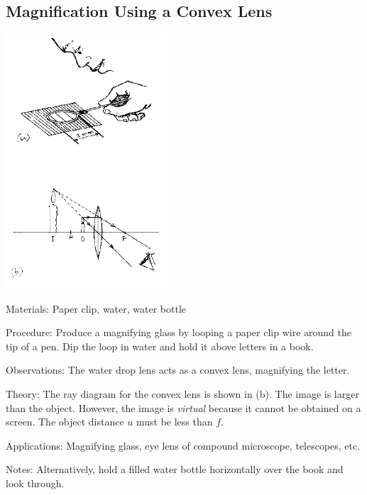 \begin{multicols}{2}
\subsection{Magnification Using a Convex Lens}

\begin{center}
\includegraphics[width=0.45\textwidth]{./img/source/magnification-convex.png}
\end{center}

\begin{description*}
\item[Materials:]{Paper clip, water, water bottle}
\item[Procedure:]{Produce a magnifying glass by looping a paper clip wire around the tip of a pen. Dip the loop in water and hold it above letters in a book.}
\item[Observations:]{The water drop lens acts as a convex lens, magnifying the letter.}
\item[Theory:]{The ray diagram for the convex lens is shown in (b). The image is larger than the object. However, the image is \emph{virtual} because it cannot be obtained on a screen. The object distance $u$ must be less than $f$.}
\item[Applications:]{Magnifying glass, eye lens of compound microscope, telescopes, etc.}
\item[Notes:]{Alternatively, hold a filled water bottle horizontally over the book and look through.}
\end{description*}


\end{multicols}
